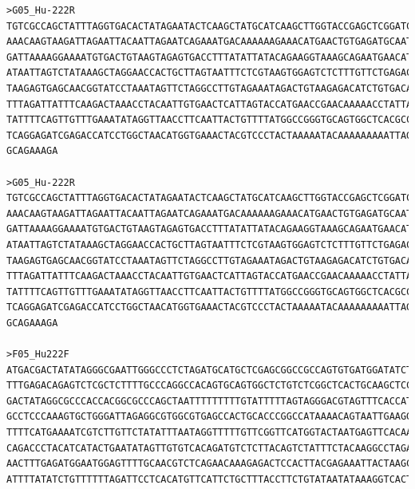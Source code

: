 \begin{verbatim}
>G05_Hu-222R
TGTCGCCAGCTATTTAGGTGACACTATAGAATACTCAAGCTATGCATCAAGCTTGGTACCGAGCTCGGATCCACTAGTAACGGCCGCCAGTGTGCTGGAATTCGCCCTTCAGTGAACGCC
AAACAAGTAAGATTAGAATTACAATTAGAATCAGAAATGACAAAAAAGAAACATGAACTGTGAGATGCAATATAAAAACTAATGGTGAACAAAGCAAAGAATAAAAAATAAAAACGGAAA
GATTAAAAGGAAAATGTGACTGTAAGTAGAGTGACCTTTATATTATACAGAAGGTAAAGCAGAATGAACATGTGAGGAATCTAAAAAACAGATATAAAATAGAAACAACTGAAGGCTTAT
ATAATTAGTCTATAAAGCTAGGAACCACTGCTTAGTAATTTCTCGTAAGTGGAGTCTCTTTGTTCTGAGACGTTGCAAAACTCCATTCCATCTCAAAGTTATTTTTAATGTTAAAATTTG
TAAGAGTGAGCAACGGTATCCTAAATAGTTCTAGGCCTTGTAGAAATAGACTGTAAGAGACATCTGTGACACAACTATATTCAGTATGATGTAGGGTCTGTTACAATGGGATGAAGTGAA
TTTAGATTATTTCAAGACTAAACCTACAATTGTGAACTCATTAGTACCATGAACCGAACAAAAACCTATTAAATATAGAACAAGACGATTTTCATGAAAAAATAAATATGAACAAATCAG
TATTTTCAGTTGTTTGAAATATAGGTTAACCTTCAATTACTGTTTTATGGCCGGGTGCAGTGGCTCACGCCACGCCTCTAATCCCAGCACTTTGGGAGGCCGAGGCAGCGGATCATGAGG
TCAGGAGATCGAGACCATCCTGGCTAACATGGTGAAACTACGTCCCTACTAAAAATACAAAAAAAAATTAGCTGGGCGCCGTGGTGGGCGCCTATAGTCCCAGCTACTTGGGAGGCTGAT
GCAGAAAGA

>G05_Hu-222R
TGTCGCCAGCTATTTAGGTGACACTATAGAATACTCAAGCTATGCATCAAGCTTGGTACCGAGCTCGGATCCACTAGTAACGGCCGCCAGTGTGCTGGAATTCGCCCTTCAGTGAACGCC
AAACAAGTAAGATTAGAATTACAATTAGAATCAGAAATGACAAAAAAGAAACATGAACTGTGAGATGCAATATAAAAACTAATGGTGAACAAAGCAAAGAATAAAAAATAAAAACGGAAA
GATTAAAAGGAAAATGTGACTGTAAGTAGAGTGACCTTTATATTATACAGAAGGTAAAGCAGAATGAACATGTGAGGAATCTAAAAAACAGATATAAAATAGAAACAACTGAAGGCTTAT
ATAATTAGTCTATAAAGCTAGGAACCACTGCTTAGTAATTTCTCGTAAGTGGAGTCTCTTTGTTCTGAGACGTTGCAAAACTCCATTCCATCTCAAAGTTATTTTTAATGTTAAAATTTG
TAAGAGTGAGCAACGGTATCCTAAATAGTTCTAGGCCTTGTAGAAATAGACTGTAAGAGACATCTGTGACACAACTATATTCAGTATGATGTAGGGTCTGTTACAATGGGATGAAGTGAA
TTTAGATTATTTCAAGACTAAACCTACAATTGTGAACTCATTAGTACCATGAACCGAACAAAAACCTATTAAATATAGAACAAGACGATTTTCATGAAAAAATAAATATGAACAAATCAG
TATTTTCAGTTGTTTGAAATATAGGTTAACCTTCAATTACTGTTTTATGGCCGGGTGCAGTGGCTCACGCCACGCCTCTAATCCCAGCACTTTGGGAGGCCGAGGCAGCGGATCATGAGG
TCAGGAGATCGAGACCATCCTGGCTAACATGGTGAAACTACGTCCCTACTAAAAATACAAAAAAAAATTAGCTGGGCGCCGTGGTGGGCGCCTATAGTCCCAGCTACTTGGGAGGCTGAT
GCAGAAAGA

>F05_Hu222F
ATGACGACTATATAGGGCGAATTGGGCCCTCTAGATGCATGCTCGAGCGGCCGCCAGTGTGATGGATATCTGCAGAATTCGCCCTTGGCCACGCGTCGACTAGTACTTTTTTTTTTTTTT
TTTGAGACAGAGTCTCGCTCTTTTGCCCAGGCCACAGTGCAGTGGCTCTGTCTCGGCTCACTGCAAGCTCCGCCTCCCGGGTTCATGCCATTCTTCTGCATCAGCCTCCCAAGTAGCTGG
GACTATAGGCGCCCACCACGGCGCCCAGCTAATTTTTTTTTGTATTTTTAGTAGGGACGTAGTTTCACCATGTTAGCCAGGATGGTCTCGATCTCCTGACCTCATGATCCGCCTGCCTCG
GCCTCCCAAAGTGCTGGGATTAGAGGCGTGGCGTGAGCCACTGCACCCGGCCATAAAACAGTAATTGAAGGTTAACCTATATTTCAAACAACTGAAAATACTGATTTGTTCATATTTATT
TTTTCATGAAAATCGTCTTGTTCTATATTTAATAGGTTTTTGTTCGGTTCATGGTACTAATGAGTTCACAATTGTAGGTTTAGTCTTGAAATAATCTAAATTCACTTCATCCCATTGTAA
CAGACCCTACATCATACTGAATATAGTTGTGTCACAGATGTCTCTTACAGTCTATTTCTACAAGGCCTAGAACTATTTAGGATACCGTTGCTCACTCTTACAAATTTTAACATTAAAAAT
AACTTTGAGATGGAATGGAGTTTTGCAACGTCTCAGAACAAAGAGACTCCACTTACGAGAAATTACTAAGCAGTGGTTCCTAGCTTTATAGACTAATTATATAAGCCTTCAGTTGTTTCT
ATTTTATATCTGTTTTTTAGATTCCTCACATGTTCATTCTGCTTTACCTTCTGTATAATATAAAGGTCACTCTACTTACAGTCACATTTCCCTTTTAATCTTTCCGTTT


\end{verbatim}
